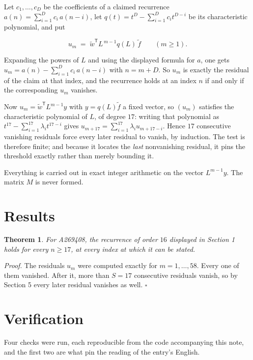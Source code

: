 \documentclass[11pt]{article}
\newtheorem{theorem}{Theorem}
\theoremstyle{definition}
\begin{document}
Let $c_1,\dots,c_D$ be the coefficients of a claimed recurrence $a(n) = \sum_{i=1}^{D} c_i\,a(n-i)$, let $q(t) = t^{D} - \sum_{i=1}^{D} c_i t^{D-i}$ be its characteristic polynomial, and put

\[u_m \;=\; \tilde w^{\mathsf T} L^{\,m-1} q(L)\,\tilde f \qquad (m \ge 1).\]

Expanding the powers of $L$ and using the displayed formula for $a$, one gets $u_m = a(n) - \sum_{i=1}^{D} c_i\,a(n-i)$ with $n = m + D$. So $u_m$ is exactly the residual of the claim at that index, and the recurrence holds at an index $n$ if and only if the corresponding $u_m$ vanishes.

Now $u_m = \tilde w^{\mathsf T} L^{m-1} y$ with $y = q(L)\tilde f$ a fixed vector, so $(u_m)$ satisfies the characteristic polynomial of $L$, of degree $17$: writing that polynomial as $t^{17} - \sum_{i=1}^{17} \lambda_i t^{17-i}$ gives $u_{m+17} = \sum_{i=1}^{17} \lambda_i u_{m+17-i}$. Hence $17$ consecutive vanishing residuals force every later residual to vanish, by induction. The test is therefore finite; and because it locates the {\itshape last} nonvanishing residual, it pins the threshold exactly rather than merely bounding it.

Everything is carried out in exact integer arithmetic on the vector $L^{m-1}y$. The matrix $M$ is never formed.

\section{Results}

\begin{theorem} For A269408, the recurrence of order $16$ displayed in Section 1 holds for every $n \ge 17$, at every index at which it can be stated.\end{theorem}

{\itshape Proof.} The residuals $u_m$ were computed exactly for $m = 1,\dots,58$. Every one of them vanished. After it, more than $S = 17$ consecutive residuals vanish, so by Section 5 every later residual vanishes as well. $\square$

\section{Verification}

Four checks were run, each reproducible from the code accompanying this note, and the first two are what pin the reading of the entry's English.
\end{document}
